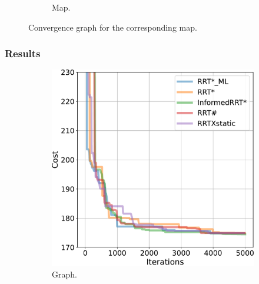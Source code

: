 \documentclass{beamer}
\begin{document}
\begin{frame}
\begin{figure}[!ht]
\begin{subfigure}[b]{0.49\textwidth}
			\caption{Map.}
			\label{fig:maze_U_Cspace} 
		\end{subfigure}  
		\caption{Convergence graph for the corresponding map.}
		\label{fig:maze_U}
	  \end{figure}
\end{frame}	

\begin{frame}
	\frametitle{Results}	
	\begin{figure}[!ht]
		\centering 
		\begin{subfigure}[b]{0.48\textwidth}
		  \includegraphics[width=\textwidth]{figChap5/graph_clutter_20pt_ticks.pdf}  
		  \caption{Graph.} 
		\end{subfigure}
		\begin{subfigure}[b]{0.49\textwidth}

\end{subfigure}
\end{figure}
\end{frame}
\end{document}
